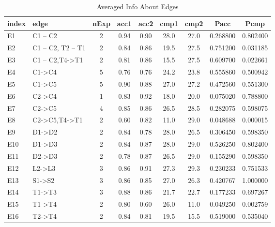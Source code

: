 \begin{table*}\begin{small}\begin{center}\caption{Averaged Info About Edges}\label{table:testedEdgesTable}\begin{tabular}
{llccccccc}
index & edge & nExp & acc1 & acc2 & cmp1 & cmp2 & Pacc & Pcmp \\
\toprule[0.16em]
E1 & C1 -- C2 & 2 & 0.94 & 0.90 & 28.0 & 27.0 & 0.268800 & 0.802400\\
E2 & C1 -- C2, T2  -- T1 & 2 & 0.84 & 0.86 & 19.5 & 27.5 & 0.751200 & 0.031185\\
E3 & C1 -- C2,T4->T1 & 2 & 0.81 & 0.86 & 15.5 & 27.5 & 0.609700 & 0.022661\\
E4 & C1->C4 & 5 & 0.76 & 0.76 & 24.2 & 23.8 & 0.555860 & 0.500942\\
E5 & C1->C5 & 5 & 0.90 & 0.88 & 27.0 & 27.2 & 0.472560 & 0.551300\\
E6 & C2->C4 & 1 & 0.83 & 0.92 & 18.0 & 20.0 & 0.075020 & 0.788800\\
E7 & C2->C5 & 4 & 0.85 & 0.86 & 26.5 & 28.5 & 0.282075 & 0.598075\\
E8 & C2->C5,T4->T1 & 2 & 0.60 & 0.82 & 11.0 & 29.0 & 0.048688 & 0.000015\\
E9 & D1->D2 & 2 & 0.84 & 0.78 & 28.0 & 26.5 & 0.306450 & 0.598350\\
E10 & D1->D3 & 2 & 0.84 & 0.87 & 28.0 & 29.0 & 0.526250 & 0.802400\\
E11 & D2->D3 & 2 & 0.78 & 0.87 & 26.5 & 29.0 & 0.155290 & 0.598350\\
E12 & L2->L3 & 3 & 0.86 & 0.91 & 27.3 & 29.3 & 0.230233 & 0.751533\\
E13 & S1->S2 & 3 & 0.86 & 0.85 & 27.0 & 26.3 & 0.420767 & 1.000000\\
E14 & T1->T3 & 3 & 0.88 & 0.86 & 21.7 & 22.7 & 0.177233 & 0.697267\\
E15 & T1->T4 & 2 & 0.80 & 0.60 & 26.0 & 11.0 & 0.049250 & 0.002759\\
E16 & T2->T4 & 2 & 0.84 & 0.81 & 19.5 & 15.5 & 0.519000 & 0.535040\\
\bottomrule[0.13em]\end{tabular}\end{center}\end{small}\end{table*}

